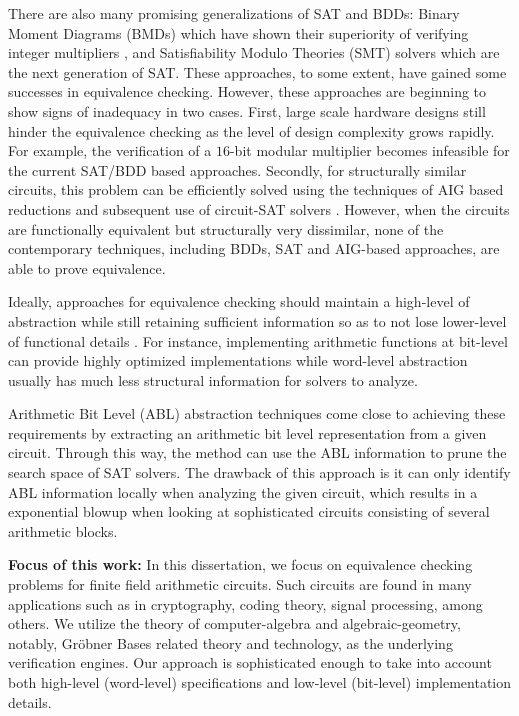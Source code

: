 There are also many promising generalizations of SAT and BDDs: 
Binary Moment Diagrams (BMDs) which have shown their 
superiority of verifying integer multipliers \cite{bmd},  and
Satisfiability Modulo Theories (SMT) solvers which are the next
generation of SAT. These approaches, to some extent, have gained
some successes in equivalence checking. However, these approaches are
beginning to show signs of inadequacy in two cases.  First, large
scale hardware designs still hinder the equivalence checking as the
level of design complexity grows rapidly. For example, the
verification of a $16$-bit modular multiplier becomes infeasible for
the current SAT/BDD based approaches. Secondly, for structurally
similar circuits, this problem can be efficiently solved using the
techniques of AIG based reductions \cite{abc} and
subsequent use of circuit-SAT solvers \cite{csat}. However, when the circuits
are functionally equivalent but structurally very dissimilar,  none of
the contemporary techniques, including BDDs, SAT and AIG-based
approaches, are able to prove equivalence.  

Ideally, approaches for equivalence checking should maintain a
high-level of abstraction while still retaining sufficient information
so as to not lose lower-level of functional details \cite{gupta_survey}. 
For instance, implementing arithmetic functions at bit-level can
provide highly optimized implementations while word-level abstraction
usually has much less structural information for solvers to analyze. 

Arithmetic Bit Level (ABL) \cite{abl:2001} abstraction techniques come
close to achieving these requirements  by extracting an arithmetic bit
level representation from a given circuit. Through this way, the
method can use the ABL information to prune the search space of SAT solvers. 
The drawback of this approach is it can only identify ABL information
locally when analyzing the given circuit, which results in a
exponential blowup when looking at sophisticated circuits consisting
of several arithmetic blocks. 

{\bf Focus of this work:}
In this dissertation, we focus on equivalence checking problems for
finite field arithmetic circuits. Such circuits are found in many
applications such as in cryptography, coding theory, signal
processing, among others. We utilize the theory of computer-algebra
and algebraic-geometry, notably, Gr\"obner Bases related theory and
technology, as the underlying verification engines. Our approach is
sophisticated enough to take into account both high-level (word-level)
specifications and low-level (bit-level) implementation details.  

